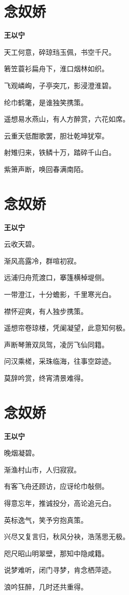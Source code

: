 \documentclass[12pt,a4paper]{ctexbook}
\begin{document}
\section{念奴娇}
\textbf{王以宁}\par\vspace{0.5em}
天工何意，碎琼珰玉佩，书空千尺。\par
箬笠蓑衫扁舟下，淮口烟林如织。\par
飞观嶙峋，子亭突兀，影浸澄淮碧。\par
纶巾鹤氅，是谁独笑携策。\par
遥想易水燕山，有人方醉赏，六花如席。\par
云重天低酣歌罢，胆壮乾坤犹窄。\par
射雉归来，铁鳞十万，踏碎千山白。\par
紫箫声断，唤回春满南陌。\par

\section{念奴娇}
\textbf{王以宁}\par\vspace{0.5em}
云收天碧。\par
渐风高露冷，群喧初寂。\par
远浦归舟荒渡口，搴篷横棹堤侧。\par
一带澄江，十分蟾影，千里寒光白。\par
襟怀迎爽，有人独步携策。\par
遥想帘卷琼楼，凭阑凝望，此意知何极。\par
声断琴箫双凤驾，凌厉飞仙同籍。\par
问汉乘槎，采珠临海，往事空踪迹。\par
莫辞吟赏，终宵清景难得。\par

\section{念奴娇}
\textbf{王以宁}\par\vspace{0.5em}
晚烟凝碧。\par
渐渔村山市，人归寂寂。\par
有客飞舟还顾访，应讶纶巾敧侧。\par
得意忘年，推诚投分，高论追元白。\par
英标逸气，笑予穷抱真策。\par
兴尽又复言归，秋风分袂，浩荡思无极。\par
咫尺昭山明翠壁，那知中隐咸籍。\par
说梦难听，闭门寻梦，肯念栖萍迹。\par
浪吟狂醉，几时还共重得。\par
\end{document}

